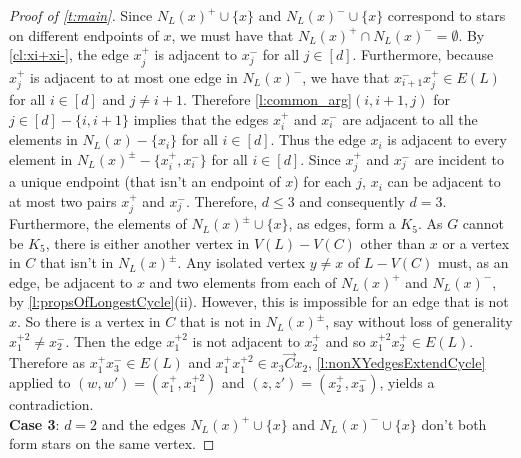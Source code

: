 \documentclass[12pt]{article}
\theoremstyle{definition}
\newcommand{\ora}{\overrightarrow{C}}
\begin{document}
\begin{proof}[Proof of \cref{t:main}]
Since $N_L(x)^+ \cup \{x\}$ and $N_L(x)^- \cup \{x\}$ correspond to stars on different endpoints of $x$, we must have that $N_L(x)^+ \cap N_L(x)^- =\emptyset$. 
By \cref{cl:xi+xi-}, the edge $x_j^+$ is adjacent to $x_j^-$ for all $j \in [d]$. Furthermore, because $x_j^+$ is adjacent to at most one edge in $N_L(x)^-$, we have that $x_{i+1}^- x_{j}^+ \in E(L)$ for all $i \in [d]$ and $j\neq i+1$.
Therefore \cref{l:common_arg}$(i,i+1,j)$ for $j \in [d]-\{i,i+1\}$ implies that the edges $x_i^+$ and $x_i^-$ are adjacent to all the elements in $N_L(x)-\{x_i\}$ 
for all $i\in [d]$.
Thus the edge $x_i$ is adjacent to every element in $N_L(x)^\pm-\{x_i^+,x_i^-\}$  for all $i\in [d]$. Since $x_j^+$ and $x_j^-$ are incident to a unique endpoint (that isn't an endpoint of $x$) for each $j$, $x_i$ can be adjacent to at most two pairs $x_j^+$ and $x_j^-$. Therefore, $d \leq 3$ and consequently $d=3$. Furthermore, the elements of $N_L(x)^\pm\cup \{x \}$, as edges, form a $K_5$.
As $G$ cannot be $K_5$, there is either another vertex in $V(L)-V(C)$ other than $x$ or a vertex in $C$ that isn't in  $N_L(x)^\pm $.
Any isolated vertex $y \neq x$ of $L-V(C)$ must, as an edge, be adjacent to $x$ and two elements from each of $N_L(x)^+$ and $N_L(x)^-$, by \cref{l:propsOfLongestCycle}(ii). However, this 
is impossible for an edge that is not $x$.
So there is a vertex in $C$ that is not in $N_L(x)^\pm$, say without loss of generality $x_1^{+2} \neq x_2^-$. Then the edge $x_1^{+2}$ is not adjacent to $x_2^+$ and so $x_1^{+2}x_2^+ \in E(L)$. Therefore as $x_1^+ x_3^{-} \in E(L)$ and $x_1^+ x_1^{+2} \in x_3\ora x_2$, \cref{l:nonXYedgesExtendCycle} applied to $(w,w')=(x_1^+,x_1^{+2})$ and $(z,z')=(x_2^+,x_3^-)$, yields a contradiction.
$ $\\

\noindent \textbf{Case 3}: $d=2$ and the edges
$N_L(x)^+ \cup \{x\}$ and $N_L(x)^- \cup \{x\}$ don't both form stars on the same vertex.


\end{proof}
\end{document}
